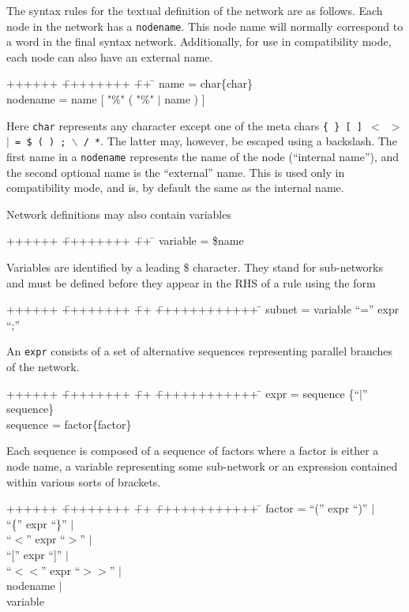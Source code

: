 
The syntax rules for the textual definition of the network are 
as follows.  Each node in the network has a \texttt{nodename}.
This node name will normally correspond to a word in the final syntax
network. Additionally, for use in compatibility mode,
each node can also have an external name.
{\sf
\begin{tabbing}
++++++ \= ++++++++ \= ++ \= \kill
\>        name \> = \> char\{char\} \\
\>        nodename \> = \> name [ "\%" ( "\%" $|$ name ) ]
\end{tabbing}}

\noindent
Here \texttt{char} represents any character except one of the meta chars 
\texttt{\{ \} [ ] $<$ $>$$|$ = \$ ( ) ; $\backslash$ / *}.   The latter may, 
however, be escaped using a backslash.  The first name in a \texttt{nodename}
represents the name of the node (``internal name''), and the second optional name is
the ``external'' name.  This is used only in compatibility mode, and is, by default
the same as the internal name.

Network definitions may also contain variables
{\sf
\begin{tabbing}
++++++ \= ++++++++ \= ++ \= \kill
\>      variable \> = \> \$name
\end{tabbing}}
\noindent
Variables are identified by a leading \$ character.  They stand for
sub-networks and must be defined before they appear in the RHS of a rule
using the form
{\sf
\begin{tabbing}
++++++ \= ++++++++ \= ++ \= ++++++++++++ \=  \kill
\>      subnet \> = \> variable ``='' expr ``;''
\end{tabbing}}
\noindent
An \texttt{expr} consists of a set of alternative sequences representing
parallel branches of the network. 
{\sf
\begin{tabbing}
++++++ \= ++++++++ \= ++ \= ++++++++++++ \=  \kill
\>      expr \>  = \> sequence \{``$|$'' sequence\} \\
\>      sequence \> = \> factor\{factor\}
\end{tabbing}}
\noindent
Each sequence is composed of a sequence of factors where a factor
is either a node name, a variable representing some sub-network or
an expression contained within various sorts of brackets.

{\sf
\begin{tabbing}
++++++ \= ++++++++ \= ++ \= ++++++++++++ \=  \kill
\>   factor \> = \> ``('' expr ``)'' \> $|$ \\
\>\>\>            ``\{'' expr ``\}'' \> $|$ \\
\>\>\>            ``$<$'' expr ``$>$'' \> $|$ \\
\>\>\>         ``['' expr ``]'' \>  $|$ \\
\>\>\>             ``$<<$'' expr ``$>>$'' \> $|$ \\
\>\>\>               nodename \> $|$ \\
\>\>\>               variable 
\end{tabbing}}

